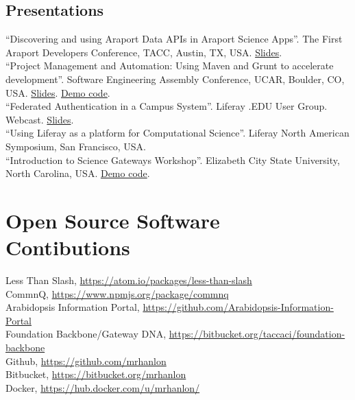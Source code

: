 \documentclass[10pt, a4paper]{article}
\newcommand{\years}[1]{\marginnote{\scriptsize #1}}
\begin{document}
\subsection*{Presentations}
\noindent
\years{2014}``Discovering and using Araport Data APIs in Araport Science Apps''. The First Araport Developers Conference, TACC, Austin, TX, USA. \href{https://github.com/Arabidopsis-Information-Portal/workshop-tutorial-app/blob/tutorial/3/TUTORIAL.md}{Slides}.\\
\years{2014}``Project Management and Automation: Using Maven and Grunt to accelerate development''. Software Engineering Assembly Conference, UCAR, Boulder, CO, USA. \href{https://mrhanlon.com/slides/sea2014}{Slides}. \href{https://github.com/mrhanlon/sea2014-demo}{Demo code}.\\
\years{2014}``Federated Authentication in a Campus System''. Liferay .EDU User Group. Webcast. \href{http://www.slideshare.net/mrhanlon/federated-authe}{Slides}.\\
\years{2013}``Using Liferay as a platform for Computational
Science''. Liferay North American Symposium, San Francisco, USA.\\
\years{2013}``Introduction to Science Gateways Workshop''. Elizabeth City State University, North Carolina, USA. \href{https://bitbucket.org/taccaci/gateway-dna-tutorial}{Demo code}.

%


\section*{Open Source Software Contibutions}
Less Than Slash, \href{https://atom.io/packages/less-than-slash}{https://atom.io/packages/less-than-slash}\\
CommnQ, \href{https://www.npmjs.org/package/commnq}{https://www.npmjs.org/package/commnq}\\
Arabidopsis Information Portal, \href{https://github.com/Arabidopsis-Information-Portal}{https://github.com/Arabidopsis-Information-Portal}\\
Foundation Backbone/Gateway DNA, \href{https://bitbucket.org/taccaci/foundation-backbone}{https://bitbucket.org/taccaci/foundation-backbone}\\
Github, \href{https://github.com/mrhanlon}{https://github.com/mrhanlon}\\
Bitbucket, \href{https://bitbucket.org/mrhanlon}{https://bitbucket.org/mrhanlon}\\
Docker, \href{https://hub.docker.com/u/mrhanlon/}{https://hub.docker.com/u/mrhanlon/}
\end{document}
